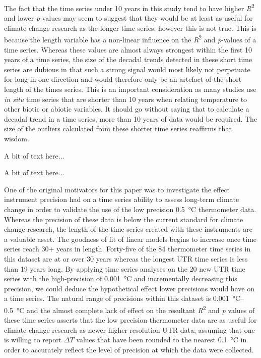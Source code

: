 \documentclass[]{ametsoc}
\begin{document}
The fact that the time series under 10 years in this study tend to have higher \emph{R}\textsuperscript{2} and lower \emph{p}-values may seem to suggest that they would be at least as useful for climate change research as the longer time series; however this is not true. This is because the length variable has a non-linear influence on the \emph{R}\textsuperscript{2} and \emph{p}-values of a time series. Whereas these values are almost always strongest within the first 10 years of a time series, the size of the decadal trends detected in these short time series are dubious in that such a strong signal would most likely not perpetuate for long in one direction and would therefore only be an artefact of the short length of the times series. This is an important consideration as many studies use \emph{in situ} time series that are shorter than 10 years when relating temperature to other biotic or abiotic variables. It should go without saying that to calculate a decadal trend in a time series, more than 10 years of data would be required. The size of the outliers calculated from these shorter time series reaffirms that wisdom.

A bit of text here...

A bit of text here...

One of the original motivators for this paper was to investigate the effect instrument precision had on a time series ability to assess long-term climate change in order to validate the use of the low precision \SI{0.5}{\degreeCelsius} thermometer data. Whereas the precision of these data is below the current standard for climate change research, the length of the time series created with these instruments are a valuable asset. The goodness of fit of linear models begins to increase once time series reach 30+ years in length. Forty-five of the 84 thermometer time series in this dataset are at or over 30 years whereas the longest UTR time series is less than 19 years long. By applying time series analyses on the 20 new UTR time series with the high-precision of \SI{0.001}{\degreeCelsius} and incrementally decreasing this precision, we could deduce the hypothetical effect lower precisions would have on a time series. The natural range of precisions within this dataset is \SIrange{0.001}{0.5}{\degreeCelsius} and the almost complete lack of effect on the resultant \emph{R}\textsuperscript{2} and \emph{p} values of these time series asserts that the low precision thermometer data are as useful for climate change research as newer higher resolution UTR data; assuming that one is willing to report $\Delta T$ values that have been rounded to the nearest \SI{0.1}{\degreeCelsius} in order to accurately reflect the level of precision at which the data were collected.
\end{document}
